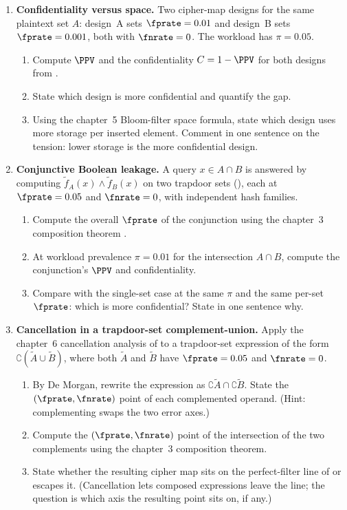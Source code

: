 \begin{enumerate}
\item \exstarstar
\label{ex:ch17-6}
\textbf{Confidentiality versus space.}
Two cipher-map designs for the same plaintext set $A$: design~A
sets $\fprate = 0.01$ and design~B sets $\fprate = 0.001$, both
with $\fnrate = 0$. The workload has $\pi = 0.05$.
\begin{enumerate}
  \item[(a)] Compute $\PPV$ and the confidentiality
    $C = 1 - \PPV$ for both designs from
    .
  \item[(b)] State which design is more confidential and quantify
    the gap.
  \item[(c)] Using the chapter~5 Bloom-filter space formula,
    state which design uses more storage per inserted element.
    Comment in one sentence on the tension: lower storage is
    the more confidential design.
\end{enumerate}

\item \exstarstar
\label{ex:ch17-7}
\textbf{Conjunctive Boolean leakage.}
A query $x \in A \cap B$ is answered by computing
$\tilde f_A(x) \wedge \tilde f_B(x)$ on two trapdoor sets
(), each at $\fprate = 0.05$ and
$\fnrate = 0$, with independent hash families.
\begin{enumerate}
  \item[(a)] Compute the overall $\fprate$ of the conjunction
    using the chapter~3 composition theorem
    .
  \item[(b)] At workload prevalence $\pi = 0.01$ for the
    intersection $A \cap B$, compute the conjunction's $\PPV$
    and confidentiality.
  \item[(c)] Compare with the single-set case at the same $\pi$
    and the same per-set $\fprate$: which is more
    confidential? State in one sentence why.
\end{enumerate}

\item \exstarstar
\label{ex:ch17-8}
\textbf{Cancellation in a trapdoor-set complement-union.}
Apply the chapter~6 cancellation analysis of
 to a trapdoor-set expression of the
form $\complement(\tilde A \cup \tilde B)$, where both
$\tilde A$ and $\tilde B$ have $\fprate = 0.05$ and
$\fnrate = 0$.
\begin{enumerate}
  \item[(a)] By De Morgan, rewrite the expression as
    $\complement \tilde A \cap \complement \tilde B$. State
    the $(\fprate, \fnrate)$ point of each complemented
    operand. (Hint: complementing swaps the two error axes.)
  \item[(b)] Compute the $(\fprate, \fnrate)$ point of the
    intersection of the two complements using the chapter~3
    composition theorem.
  \item[(c)] State whether the resulting cipher map sits on
    the perfect-filter line of 
    or escapes it. (Cancellation lets composed expressions
    leave the line; the question is which axis the resulting
    point sits on, if any.)
\end{enumerate}


\end{enumerate}
